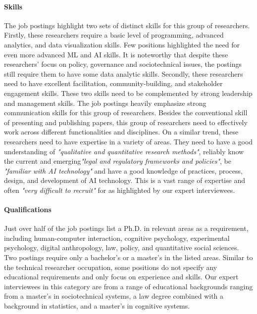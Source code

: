 \documentclass[sigconf]{acmart}
\begin{document}
\paragraph{Skills}
The job postings highlight two sets of distinct skills for this group of researchers. Firstly, these researchers require a basic level of programming, advanced analytics, and data visualization skills. Few positions highlighted the need for even more advanced ML and \ac{AI} skills. It is noteworthy that despite these researchers' focus on policy, governance and sociotechnical issues, the postings still require them to have some data analytic skills. Secondly, these researchers need to have excellent facilitation, community-building, and stakeholder engagement skills. These two skills need to be complemented by strong leadership and management skills.
The job postings heavily emphasize strong communication skills for this group of researchers. Besides the conventional skill of presenting and publishing papers, this group of researchers need to effectively work across different functionalities and disciplines.
On a similar trend, these researchers need to have expertise in a variety of areas. They need to have a good understanding of \textit{"qualitative and quantitative research methods"}, reliably know the current and emerging\textit{"legal and regulatory frameworks and policies"}, be \textit{"familiar with \ac{AI} technology"} and have a good knowledge of practices, process, design, and development of \ac{AI} technology. This is a vast range of expertise and often \textit{"very difficult to recruit"} for as highlighted by our expert interviewees. 

\paragraph{Qualifications} 
Just over half of the job postings list a Ph.D. in relevant areas as a requirement, including human-computer interaction, cognitive psychology, experimental psychology, digital anthropology, law, policy, and quantitative social sciences. Two postings require only a bachelor's or a master's in the listed areas. Similar to the technical researcher occupation, some positions do not specify any educational requirements and only focus on experience and skills. Our expert interviewees in this category are from a range of educational backgrounds ranging from a master's in sociotechnical systems, a law degree combined with a background in statistics, and a master's in cognitive systems. %
\end{document}
